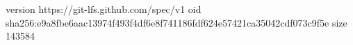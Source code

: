 version https://git-lfs.github.com/spec/v1
oid sha256:e9a8fbe6aac13974f493f4df6e8f741186fdf624e57421ca35042cdf073c9f5e
size 143584
